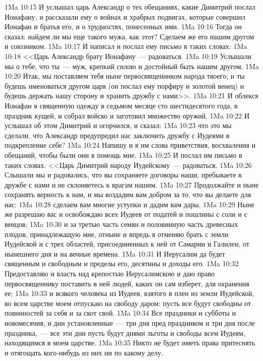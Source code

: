 \vs 1Ma 10:15 И услышал царь Александр о тех обещаниях, какие Димитрий послал Ионафану, и рассказали ему о войнах и храбрых подвигах, которые совершил Ионафан и братья его, и о трудностях, понесенных ими.
\vs 1Ma 10:16 Тогда он сказал: найдем ли мы еще такого мужа, как этот? Сделаем же его нашим другом и союзником.
\vs 1Ma 10:17 И написал и послал ему письмо в таких словах:
\vs 1Ma 10:18 <<Царь Александр брату Ионафану~--- радоваться.
\vs 1Ma 10:19 Услышали мы о тебе, что ты~--- муж, крепкий силою и достойный быть нашим другом.
\vs 1Ma 10:20 Итак, мы поставляем тебя ныне первосвященником народа твоего; и ты будешь именоваться другом царя (он послал ему порфиру и золотой венец) и будешь держать нашу сторону и хранить дружбу с нами>>.
\vs 1Ma 10:21 И облекся Ионафан в священную одежду в седьмом месяце сто шестидесятого года, в праздник кущей, и собрал войско и заготовил множество оружий.
\vs 1Ma 10:22 И услышал об этом Димитрий и огорчился, и сказал:
\vs 1Ma 10:23 что это мы сделали, что Александр предупредил нас заключить дружбу с Иудеями в подкрепление себе?
\vs 1Ma 10:24 Напишу и я им слова приветствия, восхваления и обещаний, чтобы были они в помощь мне.
\vs 1Ma 10:25 И послал им письмо в таких словах: <<Царь Димитрий народу Иудейскому~--- радоваться.
\vs 1Ma 10:26 Слышали мы и радовались, что вы сохраняете договоры наши, пребываете в дружбе с нами и не склоняетесь к врагам нашим.
\vs 1Ma 10:27 Продолжайте и ныне сохранять верность к нам, и мы воздадим вам добром за то, что вы делаете для нас:
\vs 1Ma 10:28 сделаем вам многие уступки и дадим вам дары.
\vs 1Ma 10:29 Ныне же разрешаю вас и освобождаю всех Иудеев от податей и пошлины с соли и с венцов;
\vs 1Ma 10:30 и за третью часть семян и половинную часть древесных плодов, принадлежащую мне, отныне и впредь я отменяю брать с земли Иудейской и с трех областей, присоединенных к ней от Самарии и Галилеи, от нынешнего дня и на вечные времена.
\vs 1Ma 10:31 И Иерусалим да будет священным и свободным и пределы его, десятины и доходы его.
\vs 1Ma 10:32 Предоставляю и власть над крепостью Иерусалимскою и даю право первосвященнику поставить в ней людей, каких он сам изберет, для охранения ее;
\vs 1Ma 10:33 и всякого человека из Иудеев, взятого в плен из земли Иудейской, во всем царстве моем отпускаю на свободу даром: пусть все будут свободны от повинностей за себя и за скот свой.
\vs 1Ma 10:34 Все праздники и субботы и новомесячия, и дни установленные~--- три дня пред праздником и три дня после праздника,~--- все эти дни пусть будут днями льготы и свободы всем Иудеям, находящимся в моем царстве.
\vs 1Ma 10:35 Никто не будет иметь права притеснять и отягощать кого-нибудь из них ни по какому делу.
